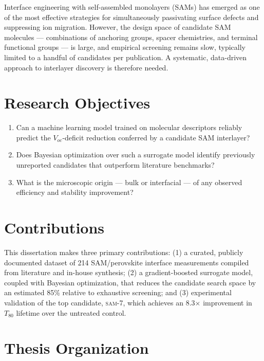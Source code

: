 \documentclass[12pt,a4paper,oneside]{report}
\begin{document}
Interface engineering with self-assembled monolayers (SAMs) has emerged as
one of the most effective strategies for simultaneously passivating surface
defects and suppressing ion migration. However, the design space of
candidate SAM molecules --- combinations of anchoring groups, spacer
chemistries, and terminal functional groups --- is large, and empirical
screening remains slow, typically limited to a handful of candidates per
publication. A systematic, data-driven approach to interlayer discovery is
therefore needed.

\section{Research Objectives}

\begin{keybox}[title=Research Questions]
\begin{enumerate}[leftmargin=*,itemsep=2pt]
\item Can a machine learning model trained on molecular descriptors
  reliably predict the $V_{oc}$-deficit reduction conferred by a candidate
  SAM interlayer?
\item Does Bayesian optimization over such a surrogate model identify
  previously unreported candidates that outperform literature benchmarks?
\item What is the microscopic origin --- bulk or interfacial --- of any
  observed efficiency and stability improvement?
\end{enumerate}
\end{keybox}

\section{Contributions}

This dissertation makes three primary contributions: (1) a curated,
publicly documented dataset of 214 SAM/perovskite interface measurements
compiled from literature and in-house synthesis; (2) a gradient-boosted
surrogate model, coupled with Bayesian optimization, that reduces the
candidate search space by an estimated 85\% relative to exhaustive
screening; and (3) experimental validation of the top candidate,
\textsc{sam-7}, which achieves an 8.3$\times$ improvement in $T_{80}$
lifetime over the untreated control.

\section{Thesis Organization}
\end{document}
